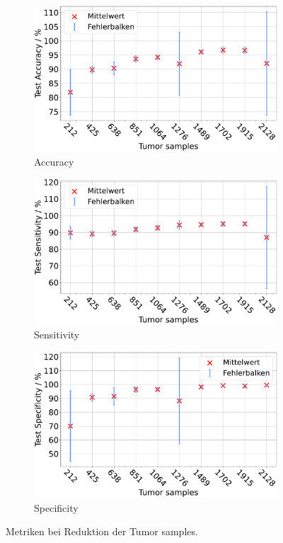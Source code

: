 \begin{figure}[H]
  \centering
  \begin{subfigure}[b]{0.48\textwidth}
    \includegraphics[width=\textwidth]{plots/neu Reduzierung-Tu + Balance_Accuracy_mean.pdf}
    \caption{Accuracy}
    \label{fig:reduzierung_tu_accuracy}
  \end{subfigure}
  \begin{subfigure}[b]{0.48\textwidth}
    \includegraphics[width=\textwidth]{plots/neu Reduzierung-Tu + Balance_Sensitivity_mean.pdf}
    \caption{Sensitivity}
    \label{fig:reduzierung_tu_sensitivity}
  \end{subfigure}
  \begin{subfigure}[b]{0.48\textwidth}
    \includegraphics[width=\textwidth]{plots/neu Reduzierung-Tu + Balance_Specificity_mean.pdf}
    \caption{Specificity}
    \label{fig:reduzierung_tu_specificity}
  \end{subfigure}
  \caption{Metriken bei Reduktion der Tumor samples.}
  \label{fig:reduzierung_tumorsamples}
\end{figure}
